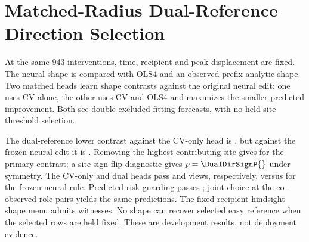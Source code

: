 \section{Matched-Radius Dual-Reference Direction Selection}

At the same 943 interventions, time, recipient and peak
displacement are fixed. The neural shape is compared with
OLS4 and an observed-prefix analytic shape. Two matched
heads learn shape contrasts against the original neural edit:
one uses CV alone, the other uses CV and OLS4 and maximizes
the smaller predicted improvement. Both see double-excluded
fitting forecasts, with no held-site threshold selection.

The dual-reference lower contrast against the CV-only head is
\DualDirPrimary{}, but against the frozen neural edit it is
\DualDirFrozen{}. Removing the highest-contributing site gives
\DualDirOmit{} for the primary contrast; a site sign-flip
diagnostic gives $p=\DualDirSignP{}$ under symmetry.
The CV-only and dual heads pass \DualDirCVPass{} and
\DualDirDualPass{} views, respectively, versus
\DualDirNeuralPass{} for the frozen neural rule.
Predicted-risk guarding passes \DualDirGuardPass{}; joint
choice at the \DualDirCoview{} co-observed role pairs yields
the same predictions. The fixed-recipient hindsight shape
menu admits \DualDirOraclePass{} witnesses. No shape can
recover selected easy reference when the selected rows are
held fixed. These are development results, not deployment evidence.
